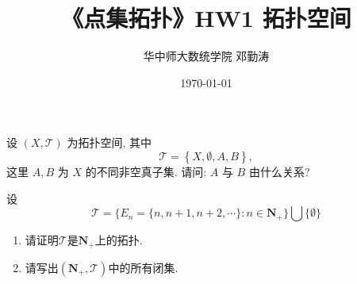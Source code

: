 \documentclass{tingtao-homework}
\title{《点集拓扑》HW1 拓扑空间}
\author{华中师大数统学院 邓勤涛}
\date{\today}
\begin{document}
\maketitle


\begin{exercise}
  设 $(X, \mathscr{T})$ 为拓扑空间, 其中
  \[\mathscr{T}=\left\{X, \emptyset, A,B\right\},\]
  这里 $A,B$ 为 $X$ 的不同非空真子集.  请问: $A$ 与 $B$ 由什么关系?
\end{exercise}

\begin{exercise}
  设
  \[
    \mathscr{T}=\{E_n=\{n, n+1, n+2, \cdots\}: n\in \mathbf{N}_+\}\bigcup\{\emptyset\}
  \]
  \begin{enumerate}
    \item 请证明$\mathscr{T}$是$\mathbf{N}_+$上的拓扑.
    \item 请写出$(\mathbf{N}_+,\mathscr{T})$中的所有闭集.
  \end{enumerate}
\end{exercise}
\end{document}
